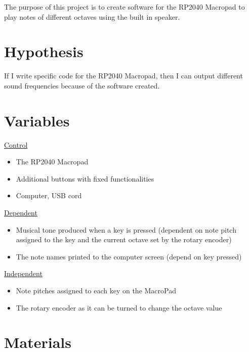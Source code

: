 \documentclass{article}
\begin{document}
The purpose of this project is to create software for the RP2040 Macropad to play notes of different octaves using the built in speaker. 

\section{Hypothesis}

If I write specific code for the RP2040 Macropad, then I can output different sound frequencies because of the software created.

\section{Variables}

\underline{Control}
\begin{itemize}
    \item The RP2040 Macropad
    \item Additional buttons with fixed functionalities
    \item Computer, USB cord
\end{itemize}
\underline{Dependent}
\begin{itemize}
    \item Musical tone produced when a key is pressed (dependent on note pitch assigned to the key and the current octave set by the rotary encoder)
    \item The note names printed to the computer screen (depend on key pressed)
\end{itemize}
\underline{Independent}
\begin{itemize}
    \item Note pitches assigned to each key on the MacroPad
    \item The rotary encoder as it can be turned to change the octave value
\end{itemize}

\section{Materials}
\end{document}
